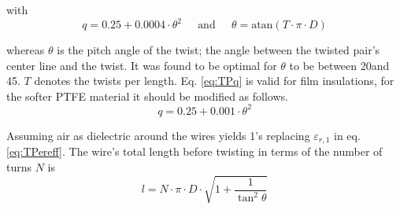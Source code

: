 with
\begin{equation}
\label{eq:TPq}
q = 0.25 + 0.0004\cdot \theta^2
\;\;\;\; \textrm{ and } \;\;\;\;
\theta = \textrm{atan}\left(T\cdot\pi\cdot D\right)
\end{equation}

whereas $\theta$ is the pitch angle of the twist; the angle between
the twisted pair's center line and the twist.  It was found to be
optimal for $\theta$ to be between 20\degree and 45\degree.  $T$
denotes the twists per length.  Eq. \eqref{eq:TPq} is valid for film
insulations, for the softer PTFE material it should be modified as
follows.
\begin{equation}
q = 0.25 + 0.001\cdot \theta^2
\end{equation}

Assuming air as dielectric around the wires yields 1's replacing
$\varepsilon_{r,1}$ in eq. \eqref{eq:TPereff}.  The wire's total
length before twisting in terms of the number of turns $N$ is
\begin{equation}
l = N\cdot\pi\cdot D\cdot\sqrt{1 + \dfrac{1}{\tan^2{\theta}}}
\end{equation}
